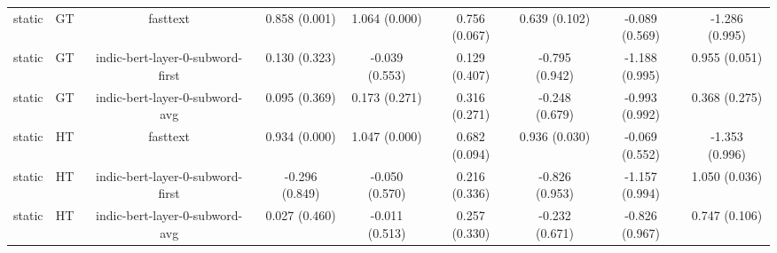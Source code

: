 \begin{sidewaystable}[htb]
\begin{tabular}{@{}ccccccccc@{}}
        static & GT & fasttext & 0.858 (0.001) & 1.064 (0.000) & 0.756 (0.067) & 0.639 (0.102) & -0.089 (0.569) & -1.286 (0.995) \\
        static & GT & indic-bert-layer-0-subword-first & 0.130 (0.323) & -0.039 (0.553) & 0.129 (0.407) & -0.795 (0.942) & -1.188 (0.995) & 0.955 (0.051) \\
        static & GT & indic-bert-layer-0-subword-avg & 0.095 (0.369) & 0.173 (0.271) & 0.316 (0.271) & -0.248 (0.679) & -0.993 (0.992) & 0.368 (0.275) \\
        static & HT & fasttext & 0.934 (0.000) & 1.047 (0.000) & 0.682 (0.094) & 0.936 (0.030) & -0.069 (0.552) & -1.353 (0.996) \\
        static & HT & indic-bert-layer-0-subword-first & -0.296 (0.849) & -0.050 (0.570) & 0.216 (0.336) & -0.826 (0.953) & -1.157 (0.994) & 1.050 (0.036) \\
        static & HT & indic-bert-layer-0-subword-avg & 0.027 (0.460) & -0.011 (0.513) & 0.257 (0.330) & -0.232 (0.671) & -0.826 (0.967) & 0.747 (0.106) \\
        \bottomrule
    \end{tabular}
\end{sidewaystable}